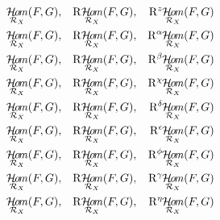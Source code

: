 \documentclass{article}
\newcommand{\Rder}[1][]{\mathop{\mathrm{R}^{#1}\!}\nolimits}
\DeclareMathOperator{\HOM}{\mathcal{H}\!\mathit{o\!m}}
\newcommand{\RHOM}[1][]{\Rder[#1]\mkern-1mu\HOM}
\newcommand{\sheaf}[1]{\mathcal{#1}}
\newcommand{\structuresheaf}[1]{\sheaf{R}_{#1}}
\begin{document}
\begin{align}
    \HOM_{\structuresheaf{X}}(F,G),&& \RHOM[]_{\structuresheaf{X}}(F,G),&& \RHOM[z]_{\structuresheaf{X}}(F,G)\\
    \HOM_{\structuresheaf{X}}(F,G),&& \RHOM[]_{\structuresheaf{X}}(F,G),&& \RHOM[\alpha]_{\structuresheaf{X}}(F,G)\\
    \HOM_{\structuresheaf{X}}(F,G),&& \RHOM[]_{\structuresheaf{X}}(F,G),&& \RHOM[\beta]_{\structuresheaf{X}}(F,G)\\
    \HOM_{\structuresheaf{X}}(F,G),&& \RHOM[]_{\structuresheaf{X}}(F,G),&& \RHOM[\chi]_{\structuresheaf{X}}(F,G)\\
    \HOM_{\structuresheaf{X}}(F,G),&& \RHOM[]_{\structuresheaf{X}}(F,G),&& \RHOM[\delta]_{\structuresheaf{X}}(F,G)\\
    \HOM_{\structuresheaf{X}}(F,G),&& \RHOM[]_{\structuresheaf{X}}(F,G),&& \RHOM[\epsilon]_{\structuresheaf{X}}(F,G)\\
    \HOM_{\structuresheaf{X}}(F,G),&& \RHOM[]_{\structuresheaf{X}}(F,G),&& \RHOM[\phi]_{\structuresheaf{X}}(F,G)\\
    \HOM_{\structuresheaf{X}}(F,G),&& \RHOM[]_{\structuresheaf{X}}(F,G),&& \RHOM[\gamma]_{\structuresheaf{X}}(F,G)\\
    \HOM_{\structuresheaf{X}}(F,G),&& \RHOM[]_{\structuresheaf{X}}(F,G),&& \RHOM[\eta]_{\structuresheaf{X}}(F,G)
\end{align}
\end{document}
